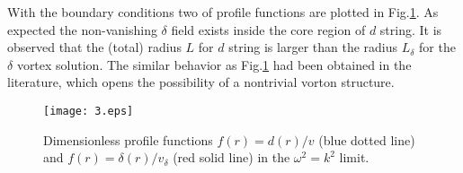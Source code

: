 \documentclass[12pt]{article}
\begin{document}
With the boundary conditions two of profile functions are plotted in Fig.\ref{fig:3}.
As expected the non-vanishing $\delta$ field exists inside the core region of $d$ string.
It is observed that the (total) radius $L$ for $d$ string is larger than the radius $L_\delta$ for the $\delta$ vortex solution. 
%  
The similar behavior as Fig.\ref{fig:3} had been obtained in the literature, which opens the possibility of a nontrivial
vorton structure.

\begin{figure}
	\texttt{[image: 3.eps]}
	\caption{Dimensionless profile functions $f(r)=d(r)/v$ (blue dotted line) and
     $f(r)=\delta(r)/v_\delta$ (red solid line) in the $\omega^2 = k^2$ limit.
     }
	\label{fig:3}
\end{figure}
\end{document}
